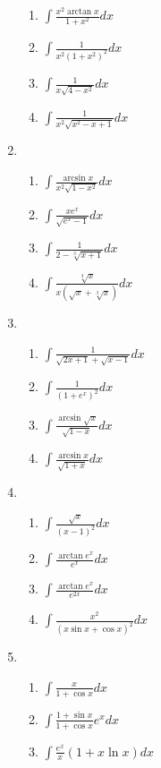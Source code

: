 \begin{enumerate}[{例}1.]
\begin{enumerate}[(1)]
                \item $\int \frac{x^2\arctan x}{1+x^2}dx$
                \item $\int \frac{1}{x^2(1+x^2)^2}dx$
                \item $\int \frac{1}{x\sqrt{4-x^2}}dx$
                \item $\int \frac{1}{x^2\sqrt{x^2-x+1}}dx$
            \end{enumerate}
    \item   \begin{enumerate}[(1)]
                \item $\int \frac{\arcsin x}{x^2\sqrt{1-x^2}}dx$
                \item $\int \frac{xe^x}{\sqrt{e^x -1}}dx$
                \item $\int \frac{1}{2-\sqrt[3]{x+1}}dx$
                \item $\int \frac{\sqrt[3]{x}}{x(\sqrt{x}+\sqrt[3]{x})}dx$
            \end{enumerate}
    \item   \begin{enumerate}[(1)]
                \item $\int \frac{1}{\sqrt{2x+1}+\sqrt{x-1}}dx$
                \item $\int \frac{1}{(1+e^x)^2}dx$
                \item $\int \frac{\arcsin \sqrt{x}}{\sqrt{1-x}}dx$
                \item $\int \frac{\arcsin x}{\sqrt{1+x}}dx$
            \end{enumerate}
    \item   \begin{enumerate}[(1)]
                \item $\int \frac{\sqrt{x}}{(x-1)^2}dx$
                \item $\int \frac{\arctan e^x}{e^x}dx$
                \item $\int \frac{\arctan e^x}{e^{2x}}dx$
                \item $\int \frac{x^2}{(x\sin x+ \cos x)^2}dx$
            \end{enumerate}
    \item   \begin{enumerate}[(1)]
                \item $\int \frac{x}{1+\cos x}dx$
                \item $\int \frac{1+\sin x}{1+\cos x}e^xdx$
                \item $\int \frac{e^x}{x}(1+x\ln x)dx$

\end{enumerate}
\end{enumerate}
